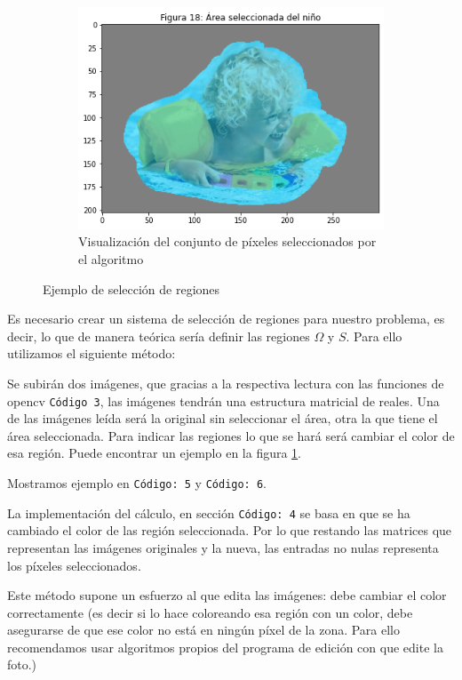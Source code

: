 \documentclass[11pt,twoside,titlepage,a4paper]{article}
\numberwithin{equation}{section} %
\theoremstyle{usual}
\begin{document}
\begin{figure}[h]
\begin{subfigure}[t]{0.25\textwidth}
        \includegraphics[width=\textwidth]{imagenes/PoissonImageEditing_cell_23_output_6.png}
        \caption{Visualización del conjunto de píxeles seleccionados por el algoritmo}
    \end{subfigure}
    \caption{Ejemplo de selección de regiones}
    \label{fig:ejemploSeleccionRegiones}
\end{figure}

Es necesario crear un sistema de selección de regiones para nuestro problema, es decir, lo que de manera teórica sería definir las regiones $\Omega$ y $S$. Para ello utilizamos el siguiente método: 

Se subirán dos imágenes, que gracias a la respectiva lectura con las funciones de opencv \texttt{Código 3}, las imágenes tendrán una estructura matricial de reales. Una de las imágenes leída será la original sin seleccionar el área, otra la que tiene el área seleccionada. Para indicar las regiones lo que se hará será cambiar el color de esa región. Puede encontrar un ejemplo en la figura \ref{fig:ejemploSeleccionRegiones}.  

Mostramos ejemplo en  \texttt{Código: 5} y \texttt{Código: 6}. 

La implementación del cálculo, en sección \texttt{Código: 4} se basa en que se ha cambiado el color de las región seleccionada.
Por lo que restando las matrices que representan las imágenes originales y la nueva, las entradas no nulas representa los píxeles seleccionados.

Este método supone un esfuerzo al que edita las imágenes: debe cambiar el color correctamente (es decir si lo hace coloreando esa región con un color, debe asegurarse de que ese color no está en ningún píxel de la zona. Para ello recomendamos usar algoritmos propios del programa de edición con que edite la foto.)
\end{document}

